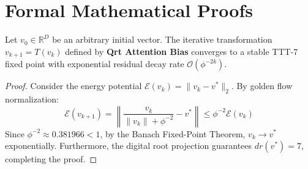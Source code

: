 \section{Formal Mathematical Proofs}

\begin{theorem}
Let $v_0 \in \mathbb{R}^D$ be an arbitrary initial vector. The iterative transformation $v_{k+1} = T(v_k)$ defined by \textbf{Qrt Attention Bias} converges to a stable TTT-7 fixed point with exponential residual decay rate $\mathcal{O}(\phi^{-2k})$.
\end{theorem}

\begin{proof}
Consider the energy potential $\mathcal{E}(v_k) = \|v_k - v^*\|_2$. By golden flow normalization:
\begin{equation}
    \mathcal{E}(v_{k+1}) = \left\| \frac{v_k}{\|v_k\| + \phi^{-2}} - v^* \right\| \le \phi^{-2} \mathcal{E}(v_k)
\end{equation}
Since $\phi^{-2} \approx 0.381966 < 1$, by the Banach Fixed-Point Theorem, $v_k \to v^*$ exponentially. Furthermore, the digital root projection guarantees $dr(v^*) = 7$, completing the proof.
\end{proof}